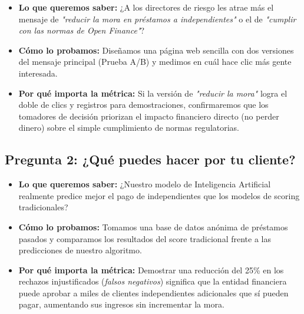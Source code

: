 \documentclass[11pt,a4paper]{article}
\begin{document}
\begin{tcolorbox}[colback=lightgray,colframe=secondary,title=\textbf{Experimento 1.2: Prueba A/B en página web para ver qué mensaje llama más la atención}]
\begin{itemize}[leftmargin=*]
    \item \textbf{Lo que queremos saber:} ¿A los directores de riesgo les atrae más el mensaje de \textit{"reducir la mora en préstamos a independientes"} o el de \textit{"cumplir con las normas de Open Finance"}?
    \item \textbf{Cómo lo probamos:} Diseñamos una página web sencilla con dos versiones del mensaje principal (Prueba A/B) y medimos en cuál hace clic más gente interesada.
    \item \textbf{Por qué importa la métrica:} Si la versión de \textit{"reducir la mora"} logra el doble de clics y registros para demostraciones, confirmaremos que los tomadores de decisión priorizan el impacto financiero directo (no perder dinero) sobre el simple cumplimiento de normas regulatorias.
\end{itemize}
\end{tcolorbox}

\subsection{Pregunta 2: ¿Qué puedes hacer por tu cliente?}

\begin{tcolorbox}[colback=lightgray,colframe=secondary,title=\textbf{Experimento 2.1: Probar el modelo con datos pasados (Backtesting)}]
\begin{itemize}[leftmargin=*]
    \item \textbf{Lo que queremos saber:} ¿Nuestro modelo de Inteligencia Artificial realmente predice mejor el pago de independientes que los modelos de scoring tradicionales?
    \item \textbf{Cómo lo probamos:} Tomamos una base de datos anónima de préstamos pasados y comparamos los resultados del score tradicional frente a las predicciones de nuestro algoritmo.
    \item \textbf{Por qué importa la métrica:} Demostrar una reducción del 25\% en los rechazos injustificados (\textit{falsos negativos}) significa que la entidad financiera puede aprobar a miles de clientes independientes adicionales que sí pueden pagar, aumentando sus ingresos sin incrementar la mora.
\end{itemize}
\end{tcolorbox}
\end{document}
